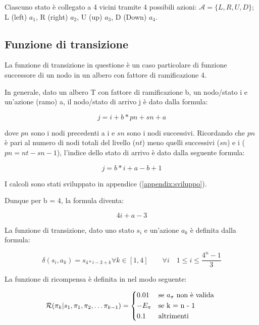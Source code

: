 \documentclass[conference]{IEEEtran}
\begin{document}
Ciascuno stato è collegato a 4 vicini tramite 4 possibili azioni: $\mathcal{A} = \{ L, R, U, D\}$; L (left) $a_1$, R (right) $a_2$, U (up) $a_3$, D (Down) $a_4$.

\subsection{Funzione di transizione}

La funzione di transizione in questione è un caso particolare di funzione successore di un nodo in un albero con fattore di ramificazione 4.

In generale, dato un albero T con fattore di ramificazione b, un nodo/stato i e un'azione (ramo) a, il nodo/stato di arrivo j è dato dalla formula:

\begin{equation}
j = i + b*pn + sn + a
\end{equation}

dove $pn$ sono i nodi precedenti a i e $sn$ sono i nodi successivi. Ricordando che $pn$ è pari al numero di nodi totali del livello ($nt$) meno quelli successivi ($sn$) e i ($pn = nt - sn - 1$), l'indice dello stato di arrivo è dato dalla seguente formula:

\begin{equation}
j = b*i + a - b + 1
\end{equation}

I calcoli sono stati sviluppato in appendice (\ref{appendix:sviluppo}).

Dunque per b = 4, la formula diventa:

\begin{equation}
\label{eq:trans}
\tag{Funzione di transizione}
4i + a - 3
\end{equation}

La funzione di transizione, dato uno stato $s_i$ e un'azione $a_k$ è definita dalla formula:

\begin{equation}
\delta(s_i, a_k) = s_{4*i - 3 + k} \forall k \in [1,4] \qquad \forall i \quad 1 \leq i \leq \frac{4^n - 1}{3}
\end{equation}

La funzione di ricompensa è definita in \cite{CzibulaPFP} nel modo seguente:

\begin{equation}
    \label{eq:rew}
    \mathcal{R}(\pi_k| s_1, \pi_1, \pi_2, \dots \pi_{k-1}) =
    \begin{cases*}
      0.01 & se $a_{\pi}$ non è valida \\
      - E_{\pi} & se k = n - 1 \\
      0.1 & altrimenti
    \end{cases*}
\end{equation}
\end{document}
